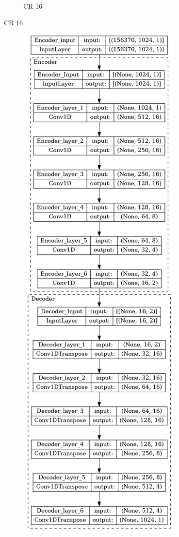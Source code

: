 \begin{appendices}
\begin{figure}
\begin{subfigure}{.5\textwidth}
			\caption{CR 16}
		\end{subfigure}
	\end{figure}
	\begin{figure}
		\ContinuedFloat 
		\begin{subfigure}{.49\textwidth}
			\includegraphics[width=\linewidth,height=\textheight]{../../Images/CR_32.png}

\end{subfigure}
\end{figure}
\end{appendices}
